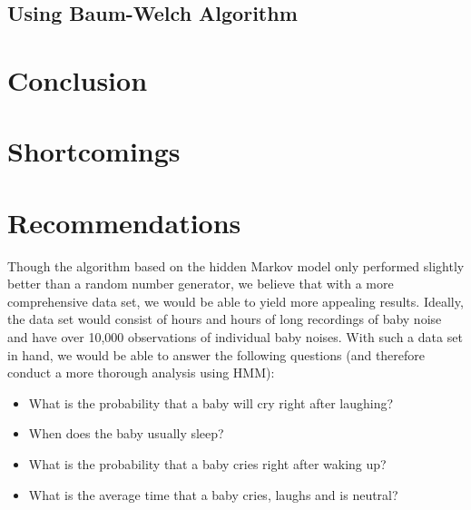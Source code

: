 \documentclass[paper=a4, fontsize=11pt]{scrartcl}
\numberwithin{equation}{section}
\numberwithin{figure}{section}
\numberwithin{table}{section}
\begin{document}
\subsection{Using Baum-Welch Algorithm}

\section{Conclusion}

\section{Shortcomings}

\section{Recommendations}
Though the algorithm based on the hidden Markov model only performed slightly better than a random number generator, we believe that with a more comprehensive data set, we would be able to yield more appealing results. Ideally, the data set would consist of hours and hours of long recordings of baby noise and have over 10,000 observations of individual baby noises. With such a data set in hand, we would be able to answer the following questions (and therefore conduct a more thorough analysis using HMM):

\begin{itemize}
	\item What is the probability that a baby will cry right after laughing?
    \item When does the baby usually sleep?
    \item What is the probability that a baby cries right after waking up?
    \item What is the average time that a baby cries, laughs and is neutral? 
\end{itemize}
\end{document}
